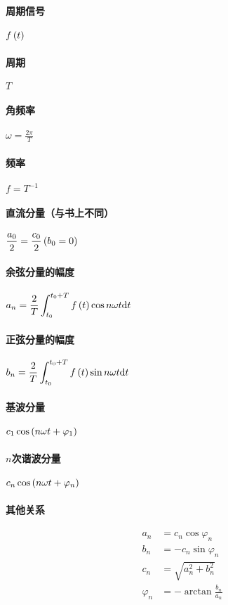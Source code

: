 \documentclass{article}
\begin{document}
\paragraph{周期信号}$f\left(t\right)$

\paragraph{周期}$T$

\paragraph{角频率}$\displaystyle\omega=\frac{2\pi}T$

\paragraph{频率}$f=T^{-1}$

\paragraph{直流分量（与书上不同）}$\displaystyle\frac{a_0}2=\frac{c_0}2\left(b_0=0\right)$

\paragraph{余弦分量的幅度}$\displaystyle a_n=\frac2T\int_{t_0}^{t_0+T}f\left(t\right)\cos n\omega t\mathrm d t$

\paragraph{正弦分量的幅度}$\displaystyle b_n=\frac2T\int_{t_0}^{t_0+T}f\left(t\right)\sin n\omega t\mathrm d t$

\paragraph{基波分量}$c_1\cos\left(n\omega t+\varphi_1\right)$

\paragraph{$n$次谐波分量}$c_n\cos\left(n\omega t+\varphi_n\right)$

\paragraph{其他关系}

\[\begin{aligned}
        a_n       & =c_n\cos\varphi_n        \\
        b_n       & =-c_n\sin\varphi_n       \\
        c_n       & =\sqrt{a_n^2+b_n^2}      \\
        \varphi_n & =-\arctan\frac{b_n}{a_n}
    \end{aligned}\]
\end{document}
